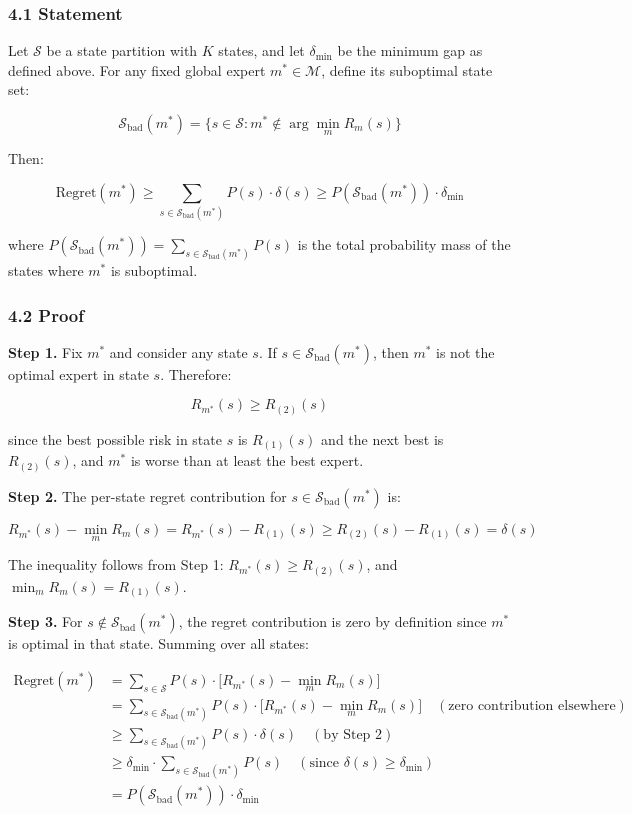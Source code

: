 \documentclass[
  12pt,
]{article}
\begin{document}
\subsubsection{4.1 Statement}\label{statement}

Let \(\mathcal{S}\) be a state partition with \(K\) states, and let
\(\delta_{\min}\) be the minimum gap as defined above. For any fixed
global expert \(m^* \in \mathcal{M}\), define its suboptimal state set:

\[\mathcal{S}_{\text{bad}}(m^*) = \bigl\{s \in \mathcal{S} : m^* \notin \arg\min_{m} R_m(s)\bigr\}\]

Then:

\[\text{Regret}(m^*) \geq \sum_{s \in \mathcal{S}_{\text{bad}}(m^*)} P(s) \cdot \delta(s) \geq P(\mathcal{S}_{\text{bad}}(m^*)) \cdot \delta_{\min}\]

where
\(P(\mathcal{S}_{\text{bad}}(m^*)) = \sum_{s \in \mathcal{S}_{\text{bad}}(m^*)} P(s)\)
is the total probability mass of the states where \(m^*\) is suboptimal.

\subsubsection{4.2 Proof}\label{proof}

\textbf{Step 1.} Fix \(m^*\) and consider any state \(s\). If
\(s \in \mathcal{S}_{\text{bad}}(m^*)\), then \(m^*\) is not the optimal
expert in state \(s\). Therefore:

\[R_{m^*}(s) \geq R_{(2)}(s)\]

since the best possible risk in state \(s\) is \(R_{(1)}(s)\) and the
next best is \(R_{(2)}(s)\), and \(m^*\) is worse than at least the best
expert.

\textbf{Step 2.} The per-state regret contribution for
\(s \in \mathcal{S}_{\text{bad}}(m^*)\) is:

\[R_{m^*}(s) - \min_{m} R_m(s) = R_{m^*}(s) - R_{(1)}(s) \geq R_{(2)}(s) - R_{(1)}(s) = \delta(s)\]

The inequality follows from Step 1: \(R_{m^*}(s) \geq R_{(2)}(s)\), and
\(\min_m R_m(s) = R_{(1)}(s)\).

\textbf{Step 3.} For \(s \notin \mathcal{S}_{\text{bad}}(m^*)\), the
regret contribution is zero by definition since \(m^*\) is optimal in
that state. Summing over all states:

\[\begin{aligned}
\text{Regret}(m^*) &= \sum_{s \in \mathcal{S}} P(s) \cdot \bigl[R_{m^*}(s) - \min_m R_m(s)\bigr] \\
&= \sum_{s \in \mathcal{S}_{\text{bad}}(m^*)} P(s) \cdot \bigl[R_{m^*}(s) - \min_m R_m(s)\bigr] \quad (\text{zero contribution elsewhere}) \\
&\geq \sum_{s \in \mathcal{S}_{\text{bad}}(m^*)} P(s) \cdot \delta(s) \quad (\text{by Step 2}) \\
&\geq \delta_{\min} \cdot \sum_{s \in \mathcal{S}_{\text{bad}}(m^*)} P(s) \quad (\text{since } \delta(s) \geq \delta_{\min}) \\
&= P(\mathcal{S}_{\text{bad}}(m^*)) \cdot \delta_{\min}
\end{aligned}\]
\end{document}
